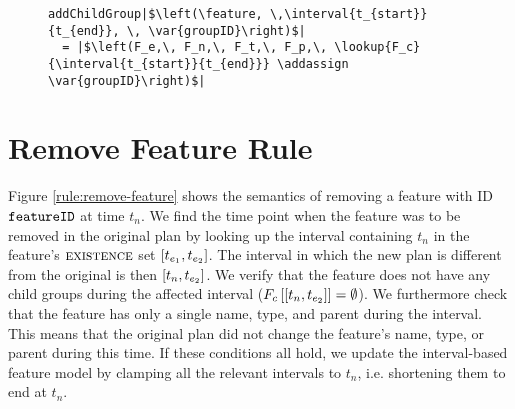 \begin{figure}
  \begin{verbatim}
addChildGroup|$\left(\feature, \,\interval{t_{start}}{t_{end}}, \, \var{groupID}\right)$|
  = |$\left(F_e,\, F_n,\, F_t,\, F_p,\, \lookup{F_c}{\interval{t_{start}}{t_{end}}} \addassign \var{groupID}\right)$|
  \end{verbatim}
  \caption{}
  \label{fun:add-child-group}
\end{figure}

\section{Remove Feature Rule}
\label{sec:remove-feature-rule}

Figure \ref{rule:remove-feature} shows the semantics of removing a feature with ID $\texttt{featureID}$ at time $t_n$. We find the time point when the feature was to be removed in the original plan by looking up the interval containing $t_n$ in the feature's $\textsc{existence}$ set $\interval{t_{e_1}}{t_{e_2}}$. The interval in which the new plan is different from the original is then $\interval{t_n}{t_{e_2}}$. We verify that the feature does not have any child groups during the affected interval ($\lookup{F_c}{\interval{t_{n}}{t_{e_2}}} = \emptyset$). We furthermore check that the feature has only a single name, type, and parent during the interval. This means that the original plan did not change the feature's name, type, or parent during this time. If these conditions all hold, we update the interval-based feature model by clamping all the relevant intervals to $t_n$, i.e. shortening them to end at $t_n$.  

